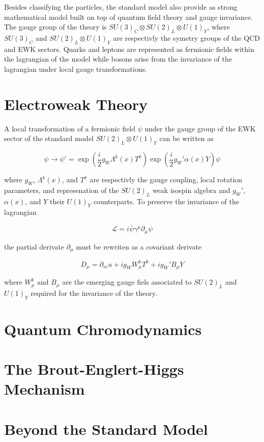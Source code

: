   Besides classifying the particles, the standard model also provide as strong mathematical model built on top of quantum field theory and gauge invariance. The gauge group of the theory is $ SU(3)_C \otimes SU(2)_L \otimes U(1)_Y $, where $ SU(3)_C $ and $ SU(2)_L \otimes U(1)_Y $ are respectivly the symetry groups of the QCD and EWK sectors. Quarks and leptons are represented as fermionic fields within the lagrangian of the model while bosons arise from the invariance of the lagrangian under local gauge transformations.

  \section{Electroweak Theory}

    A local transformation of a fermionic field $ \psi $ under the gauge group of the EWK sector of the standard model $ SU(2)_L \otimes U(1)_Y $ can be written as

    \begin{equation}
      \psi \rightarrow \psi' = \exp\left( \frac{i}{2} g_W \Lambda^k(x) T^k \right) \exp\left( \frac{i}{2} g_W' \alpha(x) Y \right) \psi
    \end{equation}

    where $ g_W $, $ \Lambda^k(x) $, and $ T^k $ are respectivly the gauge coupling, local rotation parameters, and represenation of the $ SU(2)_L $ weak isospin algebra and $ g_W' $, $ \alpha(x) $, and $ Y $ their $ U(1)_Y $ counterparts. To preserve the invariance of the lagrangian

    \begin{equation}
      \mathcal{L} = i \bar{\psi} \gamma^\mu \partial_\mu \psi
    \end{equation}

    the partial derivate $ \partial_\mu $ must be rewriten as a covariant derivate

    \begin{equation}
      D_\mu = \partial_mu + i g_W W^k_\mu T^k + i g_W' B_\mu Y
    \end{equation}

    where $ W^k_\mu $ and $ B_\mu$ are the emerging gauge fiels associated to $ SU(2)_L $ and $ U(1)_Y $ required for the invariance of the theory.

  \section{Quantum Chromodynamics}

  \section{The Brout-Englert-Higgs Mechanism}

  \section{Beyond the Standard Model}
